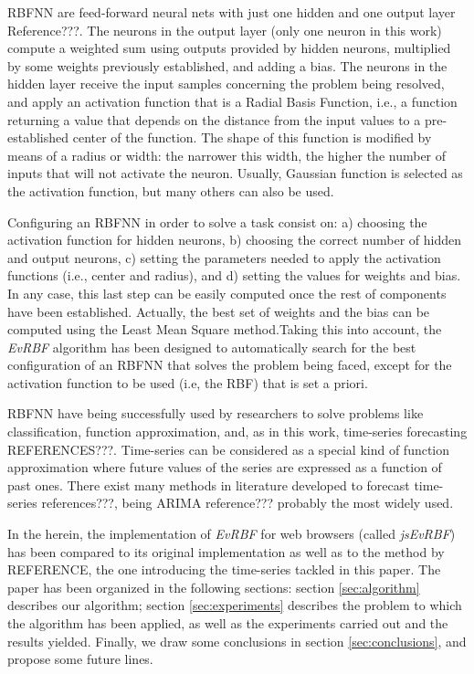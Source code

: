 \documentclass{llncs}
\begin{document}
RBFNN are feed-forward neural nets with just one hidden and one output layer Reference???. The neurons in the output layer (only one neuron in this work) compute a weighted sum using outputs provided by hidden neurons, multiplied by some weights previously established, and adding a bias. The neurons in the hidden layer receive the input samples concerning the problem being resolved, and apply an activation function that  is a Radial Basis Function, i.e., a function returning a value that depends on the distance from the input values to a pre-established center of the function. The shape of this function is modified by means of a radius or width: the narrower this width, the higher the number of inputs that will not activate the neuron. Usually, Gaussian function is selected as the activation function, but many others can also be used.

Configuring an RBFNN in order to solve a task consist on: a) choosing the activation function for hidden neurons, b) choosing the correct number of hidden and output neurons,  c) setting the parameters needed to apply the activation functions (i.e., center and radius), and d) setting the values for weights and bias. In any case, this last step can be easily computed once the rest of components have been established. Actually, the best set of weights and the bias can be computed using the Least Mean Square method.Taking this into account, the {\em EvRBF} algorithm has been designed to automatically search for the best configuration of an RBFNN that solves the problem being faced, except for the activation function to be used (i.e, the RBF) that is set a priori.

RBFNN have being successfully used by researchers to solve problems like classification, function approximation, and, as in this work, time-series forecasting REFERENCES???. Time-series can be considered as a special kind of function approximation where future values of the series are expressed as a function of past ones. There exist many methods in literature developed to forecast time-series references???, being ARIMA reference??? probably the most widely used. 

In the herein, the implementation of {\em EvRBF} for web browsers (called {\em jsEvRBF}) has been compared to its original implementation as well as  to the method by REFERENCE, the one introducing the time-series tackled in this paper. The paper has been organized in the following sections: section \ref{sec:algorithm} describes our algorithm; section \ref{sec:experiments} describes the problem to which the algorithm has been applied, as well as the experiments carried out and the results yielded. Finally, we draw some conclusions in section \ref{sec:conclusions}, and propose some future lines.
\end{document}

